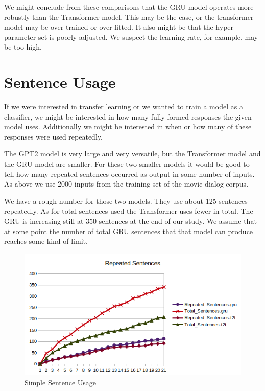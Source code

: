 We might conclude from these comparisons that the GRU model operates more robustly than the Transformer model. This may be the case, or the transformer model may be over trained or over fitted. It also might be that the hyper parameter set is poorly adjusted. We suspect the learning rate, for example, may be too high.

\section{Sentence Usage}

If we were interested in transfer learning or we wanted to train a model as a classifier, we might be interested in how many fully formed responses the given model uses. Additionally we might be interested in when or how many of these responses were used repeatedly.

The GPT2 model is very large and very versatile, but the Transformer model and the GRU model are smaller. For these two smaller models it would be good to tell how many repeated sentences occurred as output in some number of inputs. As above we use 2000 inputs from the training set of the movie dialog corpus.

We have a rough number for those two models. They use about 125 sentences repeatedly. As for total sentences used the Transformer uses fewer in total. The GRU is increasing still at 350 sentences at the end of our study. We assume that at some point the number of total GRU sentences that that model can produce reaches some kind of limit.

\begin{figure}[H]
	\begin{center}
		\includegraphics[scale=0.75]{Figure_8}
		
		
	\end{center}
	\caption[Simple Sentence Usage]{Simple Sentence Usage}
	
	
\end{figure}


